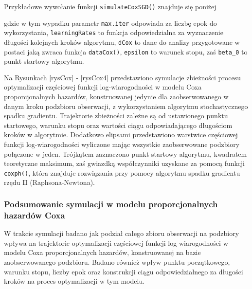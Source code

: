Przykładowe wywołanie funkcji \texttt{simulateCoxSGD()} znajduje się poniżej

\begin{Shaded}
\begin{Highlighting}[]
 \NormalTok{/(}\NormalTok{*}
                \NormalTok{, } \NormalTok{, } \NormalTok{(}\NormalTok{,}\NormalTok{))}
\end{Highlighting}
\end{Shaded}
gdzie w tym wypadku parametr \texttt{max.iter} odpowiada za liczbę epok do wykorzystania, \texttt{learningRates} to funkcja odpowiedzialna za wyznaczenie długości kolejnych kroków algorytmu, \texttt{dCox} to dane do analizy przygotowane w postaci jaką zwraca funkcja \texttt{dataCox()}, \texttt{epsilon} to warunek stopu, zaś \texttt{beta\_0} to punkt startowy algorytmu.

Na Rysunkach \ref{rysCox} - \ref{rysCox4} przedstawiono symulacje zbieżności procesu optymalizacji częściowej funkcji log-wiarogodności w modelu Coxa proporcjonalnych hazardów, konstruowanej jedynie dla zaobserwowanego w danym kroku podzbioru obserwacji, z wykorzystaniem algorytmu stochastycznego spadku gradientu. Trajektorie zbieżności zależne są od ustawionego punktu startowego, warunku stopu oraz wartości ciągu odpowiadającego długościom kroków w algorytmie. Dodatkowo elipsami przedstawiono warstwice częściowej funkcji log-wiarogodności wyliczone mając wszystkie zaobserwowane podzbiory połączone w jeden. Trójkątem zaznaczono punkt startowy algorytmu, kwadratem teoretyczne maksimum, zaś gwiazdką współczynniki uzyskane za pomocą funkcji \texttt{coxph()}, która znajduje rozwiązania przy pomocy algorytmu spadku gradientu rzędu II (Raphsona-Newtona).

\newpage
\subsubsection{Podsumowanie symulacji w modelu proporcjonalnych hazardów Coxa}

W trakcie symulacji badano jak podział całego zbioru obserwacji na podzbiory wpływa na trajektorie optymalizacji częściowej funkcji log-wiarogodności w modelu Coxa proporcjonalnych hazardów, konstruowanej na bazie zaobserwowanego podzbioru. Badano również wpływ punktu początkowego, warunku stopu, liczby epok oraz konstrukcji ciągu odpowiedzialnego za długości kroków na proces optymalizacji w tym modelu. 

